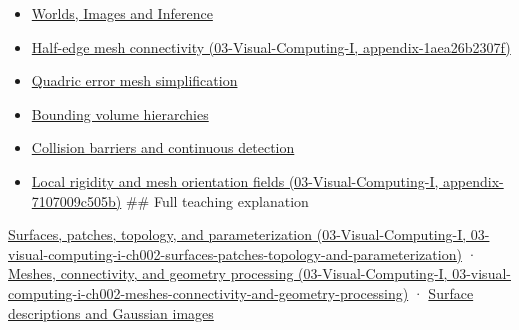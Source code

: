 \begin{itemize}
\item
  \href{Continuous\%20Notes/University\%20-\%20Worlds,\%20Images\%20and\%20Inference\%20-\%20Graphics,\%20Vision\%20and\%20Photography}{Worlds, Images and Inference}
\item
  \href{../03-Visual-Computing-I/main.pdf\#nameddest=appendix-1aea26b2307f}{Half-edge mesh connectivity (03-Visual-Computing-I, appendix-1aea26b2307f)}
\item
  \hyperref[appendix-1dd4ad54ca57]{Quadric error mesh simplification}
\item
  \hyperref[appendix-0b426c47dd78]{Bounding volume hierarchies}
\item
  \hyperref[appendix-a9ba01fa72a6]{Collision barriers and continuous detection}
\item
  \href{../03-Visual-Computing-I/main.pdf\#nameddest=appendix-7107009c505b}{Local rigidity and mesh orientation fields (03-Visual-Computing-I, appendix-7107009c505b)} \#\# Full teaching explanation
\end{itemize}

\href{../03-Visual-Computing-I/main.pdf\#nameddest=03-visual-computing-i-ch002-surfaces-patches-topology-and-parameterization}{Surfaces, patches, topology, and parameterization (03-Visual-Computing-I, 03-visual-computing-i-ch002-surfaces-patches-topology-and-parameterization)} · \href{../03-Visual-Computing-I/main.pdf\#nameddest=03-visual-computing-i-ch002-meshes-connectivity-and-geometry-processing}{Meshes, connectivity, and geometry processing (03-Visual-Computing-I, 03-visual-computing-i-ch002-meshes-connectivity-and-geometry-processing)} · \hyperref[04-visual-computing-ii-ch032-surface-descriptions-and-gaussian-images]{Surface descriptions and Gaussian images}
